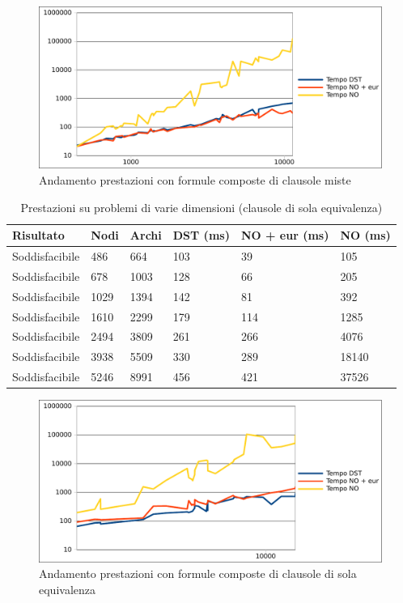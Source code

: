 \documentclass[a4paper,11pt]{article}
\begin{document}
\begin{figure}[htp]
\caption{Andamento prestazioni con formule composte di clausole miste}
\centering
\includegraphics[scale=0.8]{mixed.pdf}
\end{figure}
\begin{table}[htp]
\caption{Prestazioni su problemi di varie dimensioni (clausole di sola equivalenza)}
\centering
\begin{tabular}{| l | l | l | l | l | l |}
\hline
Risultato & Nodi & Archi & DST (ms) & NO + eur (ms) & NO (ms) \\
\hline
Soddisfacibile & 486 & 664 & 103 & 39 & 105 \\
Soddisfacibile & 678 & 1003 & 128 & 66 & 205 \\
Soddisfacibile & 1029 & 1394 & 142 & 81 & 392 \\
Soddisfacibile & 1610 & 2299 & 179 & 114 & 1285 \\
Soddisfacibile & 2494 & 3809 & 261 & 266 & 4076 \\
Soddisfacibile & 3938 & 5509 & 330 & 289 & 18140 \\
Soddisfacibile & 5246 & 8991 & 456 & 421 & 37526 \\
\hline
\end{tabular}
\end{table}
\begin{figure}[htp]
\caption{Andamento prestazioni con formule composte di clausole di sola equivalenza}
\centering
\includegraphics[scale=0.8]{eqonly.pdf}
\end{figure}
\end{document}
